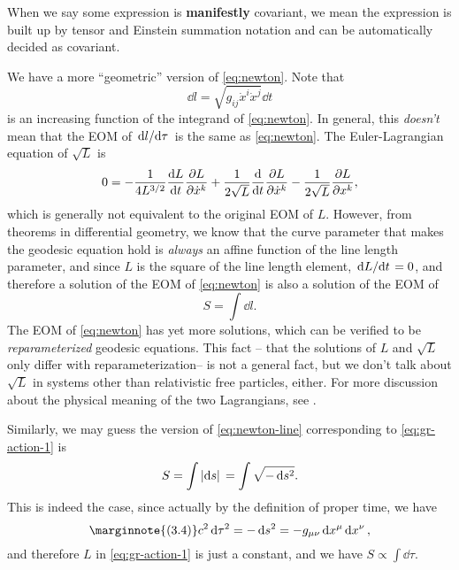 \documentclass[hyperref, a4paper]{article}
\newcommand*{\concept}[1]{{\textbf{#1}}}
\begin{document}
\begin{note*}{}
    When we say some expression is \concept{manifestly} covariant, we mean the expression is built up by 
    tensor and Einstein summation notation and can be automatically decided as covariant.
\end{note*}

We have a more ``geometric'' version of \eqref{eq:newton}. Note that 
\[
    \dd{l} = \sqrt{g_{ij} \dot{x}^i \dot{x}^j} \dd{t}
\]
is an increasing function of the integrand of \eqref{eq:newton}. In general, this \emph{doesn't} mean that 
the EOM of $\dv*{l}{\tau}$ is the same as \eqref{eq:newton}. The Euler-Lagrangian equation of $\sqrt{L}$ is 
\begin{equation}
    0 = - \frac{1}{4 L^{3/2}} \dv{L}{t} \pdv{L}{\dot{x}^k} + \frac{1}{2 \sqrt{L}} \dv{t} \pdv{L}{\dot{x}^k} - \frac{1}{2 \sqrt{L}} \pdv{L}{x^k},
\end{equation}
which is generally not equivalent to the original EOM of $L$. However, from theorems in differential geometry,
we know that the curve parameter that makes the geodesic equation hold is \emph{always} an affine function of 
the line length parameter, and since $L$ is the square of the line length element, $\dv*{L}{t} = 0$, and 
therefore a solution of the EOM of \eqref{eq:newton} is also a solution of the EOM of
\begin{equation}
    S = \int \dd{l}.
    \label{eq:newton-line}
\end{equation}
The EOM of \eqref{eq:newton} has yet more solutions, which can be verified to be \emph{reparameterized} 
geodesic equations.  This fact -- that the solutions of 
$L$ and $\sqrt{L}$ only differ with reparameterization-- is not a general fact, but we don't talk about 
$\sqrt{L}$ in systems other than relativistic free particles, either. For more discussion about the physical 
meaning of the two Lagrangians, see \cite{sqrt-lag}.

Similarly, we may guess the version of \eqref{eq:newton-line} corresponding to \eqref{eq:gr-action-1} 
is 
\begin{equation}
    S = \int \abs*{\dd{s}} = \int \sqrt{- \dd{s^2}}.
\end{equation}
This is indeed the case, since actually by the definition of proper time, we have 
\begin{equation} \marginnote{(3.4)}
    c^2 \dd{\tau^2} = - \dd{s^2} = - g_{\mu \nu} \dd{x^\mu} \dd{x^\nu},
\end{equation}
and therefore $L$ in \eqref{eq:gr-action-1} is just a constant, and we have $S \propto \int \dd{\tau}$.
\end{document}
